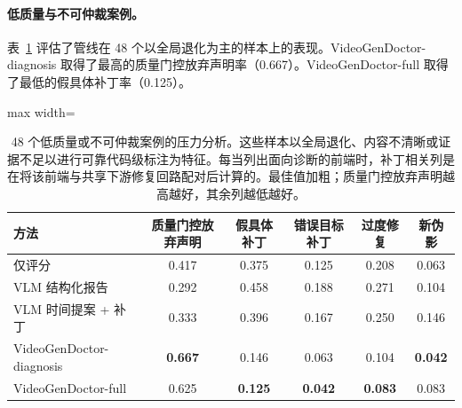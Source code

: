\documentclass{article}
\begin{document}
\begin{table}[t]
\centering\scriptsize
\caption{48 个低质量或不可仲裁案例的压力分析。这些样本以全局退化、内容不清晰或证据不足以进行可靠代码级标注为特征。每当列出面向诊断的前端时，补丁相关列是在将该前端与共享下游修复回路配对后计算的。最佳值加粗；质量门控放弃声明越高越好，其余列越低越好。}
\paragraph{低质量与不可仲裁案例。}
表~\ref{tab:low_quality_cases} 评估了管线在 48 个以全局退化为主的样本上的表现。VideoGenDoctor-diagnosis 取得了最高的质量门控放弃声明率（0.667）。VideoGenDoctor-full 取得了最低的假具体补丁率（0.125）。

\label{tab:low_quality_cases}
\begin{adjustbox}{max width=\textwidth}
\begin{tabular}{lccccc}
\toprule
方法 & 质量门控放弃声明 & 假具体补丁 & 错误目标补丁 & 过度修复 & 新伪影 \\
\midrule
仅评分 & 0.417 & 0.375 & 0.125 & 0.208 & 0.063 \\
VLM 结构化报告 & 0.292 & 0.458 & 0.188 & 0.271 & 0.104 \\
VLM 时间提案 + 补丁 & 0.333 & 0.396 & 0.167 & 0.250 & 0.146 \\
VideoGenDoctor-diagnosis & \textbf{0.667} & 0.146 & 0.063 & 0.104 & \textbf{0.042} \\
VideoGenDoctor-full & 0.625 & \textbf{0.125} & \textbf{0.042} & \textbf{0.083} & 0.083 \\
\bottomrule
\end{tabular}
\end{adjustbox}
\end{table}
\end{document}
